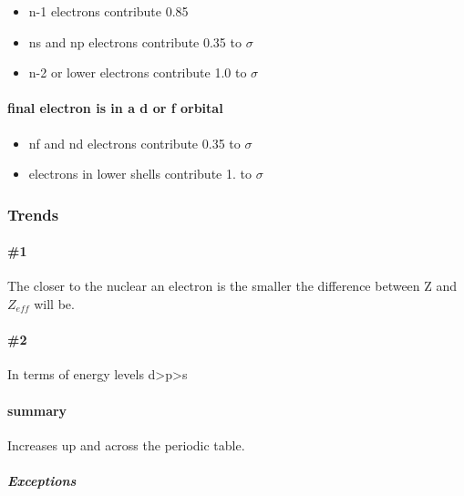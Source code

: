 \documentclass[]{article}
\providecommand{\tightlist}{%
  \setlength{\itemsep}{0pt}\setlength{\parskip}{0pt}}
\let\oldparagraph\paragraph
\renewcommand{\paragraph}[1]{\oldparagraph{#1}\mbox{}}
\let\oldsubparagraph\subparagraph
\renewcommand{\subparagraph}[1]{\oldsubparagraph{#1}\mbox{}}
\begin{document}
\begin{itemize}
\tightlist
\item
  n-1 electrons contribute 0.85
\item
  ns and np electrons contribute 0.35 to \(\sigma\quad\)
\item
  n-2 or lower electrons contribute 1.0 to \(\sigma\quad\)
\end{itemize}

\hypertarget{final-electron-is-in-a-d-or-f-orbital}{%
\paragraph{final electron is in a d or f
orbital}\label{final-electron-is-in-a-d-or-f-orbital}}

\begin{itemize}
\tightlist
\item
  nf and nd electrons contribute 0.35 to \(\sigma\quad\)
\item
  electrons in lower shells contribute 1. to \(\sigma\quad\)
\end{itemize}

\hypertarget{trends}{%
\subsubsection{Trends}\label{trends}}

\hypertarget{section}{%
\paragraph{\#1}\label{section}}

The closer to the nuclear an electron is the smaller the difference
between Z and \(Z_{eff}\) will be.

\hypertarget{section-1}{%
\paragraph{\#2}\label{section-1}}

In terms of energy levels d\textgreater{}p\textgreater{}s

\hypertarget{summary}{%
\paragraph{summary}\label{summary}}

Increases up and across the periodic table.

\hypertarget{exceptions}{%
\subparagraph{Exceptions}\label{exceptions}}
\end{document}
